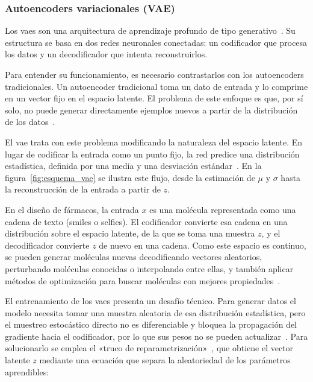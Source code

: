 \subsubsection{Autoencoders variacionales (VAE)}
\label{subsec:vae}

Los \glspl{vae} son una arquitectura de aprendizaje profundo de tipo generativo~\cite{kingma2013auto}. Su estructura se basa en dos redes neuronales conectadas: un codificador que procesa los datos y un decodificador que intenta reconstruirlos.

Para entender su funcionamiento, es necesario contrastarlos con los autoencoders tradicionales. Un autoencoder tradicional toma un dato de entrada y lo comprime en un vector fijo en el espacio latente. El problema de este enfoque es que, por sí solo, no puede generar directamente ejemplos nuevos a partir de la distribución de los datos~\cite{bishop2024deep}.

El \gls{vae} trata con este problema modificando la naturaleza del espacio latente. En lugar de codificar la entrada como un punto fijo, la red predice una distribución estadística, definida por una media y una desviación estándar~\cite{kingma2013auto}. En la figura~\ref{fig:esquema_vae} se ilustra este flujo, desde la estimación de $\mu$ y $\sigma$ hasta la reconstrucción de la entrada a partir de $z$.



En el diseño de fármacos, la entrada $x$ es una molécula representada como una cadena de texto (\gls{smiles} o \gls{selfies}). El codificador convierte esa cadena en una distribución sobre el espacio latente, de la que se toma una muestra $z$, y el decodificador convierte $z$ de nuevo en una cadena. Como este espacio es continuo, se pueden generar moléculas nuevas decodificando vectores aleatorios, perturbando moléculas conocidas o interpolando entre ellas, y también aplicar métodos de optimización para buscar moléculas con mejores propiedades~\cite{GBWHLDSA18}.

El entrenamiento de los \glspl{vae} presenta un desafío técnico. Para generar datos el modelo necesita tomar una muestra aleatoria de esa distribución estadística, pero el muestreo estocástico directo no es diferenciable y bloquea la propagación del gradiente hacia el codificador, por lo que sus pesos no se pueden actualizar~\cite{bishop2024deep}. Para solucionarlo se emplea el «truco de reparametrización»~\cite{kingma2013auto}, que obtiene el vector latente $z$ mediante una ecuación que separa la aleatoriedad de los parámetros aprendibles:

